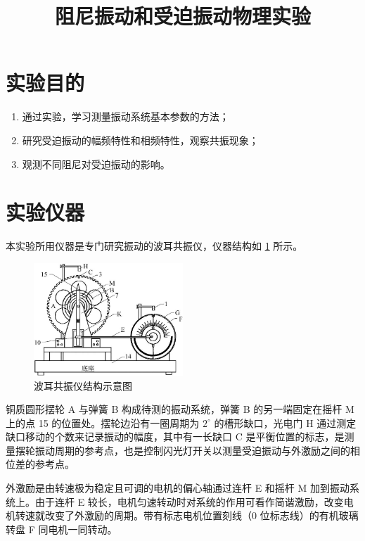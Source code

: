 \documentclass[12pt,a4paper]{amsart}
\title{阻尼振动和受迫振动物理实验}
\begin{document}
\maketitle

\section{实验目的}

\begin{enumerate}
    \item 通过实验，学习测量振动系统基本参数的方法；
    \item 研究受迫振动的幅频特性和相频特性，观察共振现象；
    \item 观测不同阻尼对受迫振动的影响。
\end{enumerate}

\section{实验仪器}

本实验所用仪器是专门研究振动的波耳共振仪，仪器结构如 \ref{fig:instruments} 所示。

\begin{figure}[H]
    \centering
    \includegraphics[width=0.5\textwidth]{img/instruments.jpg}
    \caption{波耳共振仪结构示意图}
    \label{fig:instruments}
\end{figure}

铜质圆形摆轮 A 与弹簧 B 构成待测的振动系统，弹簧 B 的另一端固定在摇杆 M 上的点 15 的位置处。摆轮边沿有一圈周期为 $2^\circ$ 的槽形缺口，光电门 H 通过测定缺口移动的个数来记录振动的幅度，其中有一长缺口 C 是平衡位置的标志，是测量摆轮振动周期的参考点，也是控制闪光灯开关以测量受迫振动与外激励之间的相位差的参考点。

外激励是由转速极为稳定且可调的电机的偏心轴通过连杆 E 和摇杆 M 加到振动系统上。由于连杆 E 较长，电机匀速转动时对系统的作用可看作简谐激励，改变电机转速就改变了外激励的周期。带有标志电机位置刻线（0 位标志线）的有机玻璃转盘 F 同电机一同转动。
\end{document}
